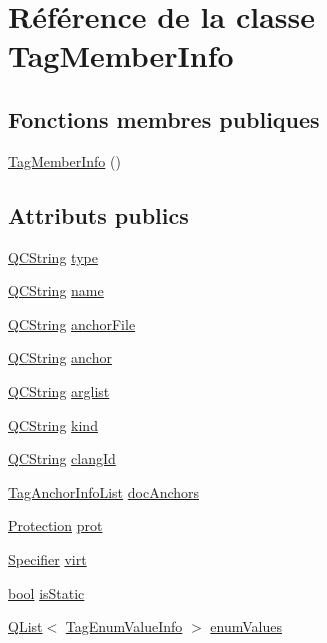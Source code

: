 \hypertarget{class_tag_member_info}{}\section{Référence de la classe Tag\+Member\+Info}
\label{class_tag_member_info}
\subsection*{Fonctions membres publiques}
\begin{DoxyCompactItemize}
\item 
\hyperlink{class_tag_member_info_adb13caa7b8da2be10e00780a8fe04e4d}{Tag\+Member\+Info} ()
\end{DoxyCompactItemize}
\subsection*{Attributs publics}
\begin{DoxyCompactItemize}
\item 
\hyperlink{class_q_c_string}{Q\+C\+String} \hyperlink{class_tag_member_info_ae90e145bfaf517d0b47b342d2297c484}{type}
\item 
\hyperlink{class_q_c_string}{Q\+C\+String} \hyperlink{class_tag_member_info_ad81f703d9cbc2be2b1adc482c56cd2bd}{name}
\item 
\hyperlink{class_q_c_string}{Q\+C\+String} \hyperlink{class_tag_member_info_aebc60ece7592e0fbd7d2033610587aa9}{anchor\+File}
\item 
\hyperlink{class_q_c_string}{Q\+C\+String} \hyperlink{class_tag_member_info_ab20ff98f375cd8134a738bc9ca78d69d}{anchor}
\item 
\hyperlink{class_q_c_string}{Q\+C\+String} \hyperlink{class_tag_member_info_a46577a5da57e5dd5d98f85fb38765656}{arglist}
\item 
\hyperlink{class_q_c_string}{Q\+C\+String} \hyperlink{class_tag_member_info_aa4c0dd35f21b4e6a8a2fdbb21ae188a2}{kind}
\item 
\hyperlink{class_q_c_string}{Q\+C\+String} \hyperlink{class_tag_member_info_a1f0b01f7cf9f3880c54453d3b6e21260}{clang\+Id}
\item 
\hyperlink{class_tag_anchor_info_list}{Tag\+Anchor\+Info\+List} \hyperlink{class_tag_member_info_a067f88b36230ce24655b30bfab86a39e}{doc\+Anchors}
\item 
\hyperlink{types_8h_a90e352184df58cd09455fe9996cd4ded}{Protection} \hyperlink{class_tag_member_info_ab6705af8092ff3b4cffee19c9d4d7eca}{prot}
\item 
\hyperlink{types_8h_ab16236bdd10ddf4d73a9847350f0017e}{Specifier} \hyperlink{class_tag_member_info_a73ff13e54210faa3046174b1898ba114}{virt}
\item 
\hyperlink{qglobal_8h_a1062901a7428fdd9c7f180f5e01ea056}{bool} \hyperlink{class_tag_member_info_a773b80f18d20211980b63dc1defbcf6d}{is\+Static}
\item 
\hyperlink{class_q_list}{Q\+List}$<$ \hyperlink{class_tag_enum_value_info}{Tag\+Enum\+Value\+Info} $>$ \hyperlink{class_tag_member_info_a406e0ceb98d5141ae5f8106d6d728cf9}{enum\+Values}
\end{DoxyCompactItemize}



